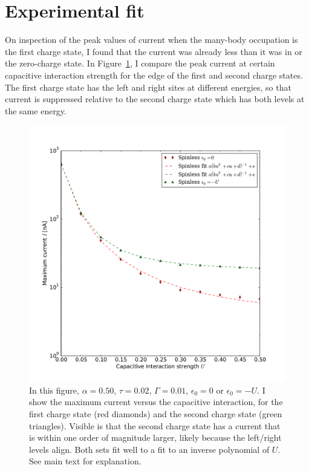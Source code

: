 \section{Experimental fit}
\label{sec:perrin}
On inspection of the peak values of current when the many-body occupation is the first charge state, I found that the current was already less than it was in \citet{perrinnano} or the zero-charge state. In Figure~\ref{fig:imax}, I compare the peak current at certain capacitive interaction strength for the edge of the first and second charge states. The first charge state has the left and right sites at different energies, so that current is suppressed relative to the second charge state which has both levels at the same energy.
\begin{figure}[htb]
    \centering
    \includegraphics[height=.38\textheight]{pdf/imax.pdf}
    \caption{In this figure, $\alpha=0.50$, $\tau=0.02$, $\Gamma=0.01$, $\epsilon_0 = 0$ or $\epsilon_0=-U$. I show the maximum current versus the capacitive interaction, for the first charge state (red diamonds) and the second charge state (green triangles). Visible is that the second charge state has a current that is within one order of magnitude larger, likely because the left/right levels align. Both sets fit well to a fit to an inverse polynomial of $U$. See main text for explanation.}
    \label{fig:imax}
\end{figure}

